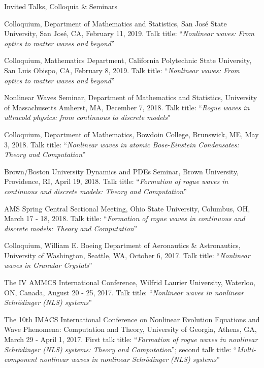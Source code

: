 \documentclass[10pt]{article} %
\begin{document}
\begin{section}{Invited Talks, Colloquia \& Seminars}
\begin{etaremune}
\item   Colloquium, Department of Mathematics and Statistics, San Jos\'e State University, San Jos\'e, CA, February 11, 2019.
       Talk title: ``\textit{Nonlinear waves: From optics to matter waves and beyond}''

\item   Colloquium, Mathematics Department, California Polytechnic State University, San Luis Obispo, CA, February 8, 2019.
       Talk title: ``\textit{Nonlinear waves: From optics to matter waves and beyond}''

\item   Nonlinear Waves Seminar, Department of Mathematics and Statistics, University of Massachusetts Amherst, MA, December 7, 2018.
        Talk title: ``\textit{Rogue waves in ultracold physics: from continuous to discrete models}"

\item   Colloquium, Department of Mathematics, Bowdoin College, Brunswick, ME, May 3, 2018.
        Talk title: ``\textit{Nonlinear waves in atomic Bose-Einstein Condensates: Theory and Computation}''

\item   Brown/Boston University Dynamics and PDEs Seminar, Brown University, Providence, RI, April 19, 2018.
        Talk title: ``\textit{Formation of rogue waves in continuous and discrete models: Theory and Computation}''

\item   AMS Spring Central Sectional Meeting, Ohio State University, Columbus, OH, March 17 - 18, 2018.
        Talk title: ``\textit{Formation of rogue waves in continuous and discrete models: Theory and Computation}''

\item   Colloquium, William E. Boeing Department of Aeronautics \& Astronautics, University of Washington, Seattle, WA, October 6, 2017.
        Talk title: ``\textit{Nonlinear waves in Granular Crystals}''

\item   The IV AMMCS International Conference, Wilfrid Laurier University, Waterloo, ON, Canada, August 20 - 25, 2017.
        Talk title: ``\textit{Nonlinear waves in nonlinear Schr\"odinger (NLS) systems}''

\item   The 10th IMACS International Conference on Nonlinear Evolution Equations and Wave Phenomena: Computation and Theory, %
        University of Georgia, Athens, GA, March 29 - April 1, 2017.
        First talk title: ``\textit{Formation of rogue waves in nonlinear Schr\"odinger (NLS) systems: Theory and Computation}'';
        second talk title: ``\textit{Multi-component nonlinear waves in nonlinear Schr\"odinger (NLS) systems}''


\end{etaremune}
\end{section}
\end{document}
